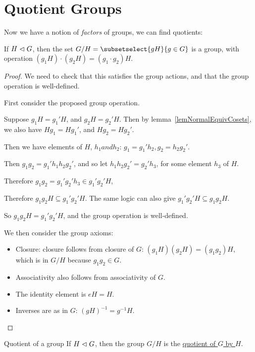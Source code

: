 \documentclass[../Main.tex]{subfiles}
\begin{document}
\section{Quotient Groups}
Now we have a notion of \textit{factors} of groups, we can find quotients:
\begin{theorem}
    If $H \vartriangleleft G$, then the set $G / H = \subsetselect{gH}{g \in G}$ is a group, with operation $(g_1 H) \cdot (g_2 H) = (g_1 \cdot g_2) H$.
    \label{thmQuotientGroups}
\end{theorem}
\begin{proof}
    We need to check that this satisfies the group actions, and that the group operation is well-defined.\par
    First consider the proposed group operation.\par
    Suppose $g_1 H = g_1' H$, and $g_2 H = g_2' H$. Then by lemma~\ref{lemNormalEquivCosets}, we also have $H g_1 = H g_1'$, and $H g_2 = H g_2'$.\par
    Then we have elements of $H$, $h_1 and h_2$: $g_1 = g_1' h_2, g_2 = h_2 g_2'$.\par
    Then $g_1 g_2 = g_1' h_1 h_2 g_2'$, and so let $h_1 h_2 g_2' = g_2' h_3$, for some element $h_3$ of $H$.\par
    Therefore $g_1 g_2 = g_1' g_2' h_3 \in g_1' g_2' H$,\par
    Therefore $g_1 g_2 H \subseteq g_1' g_2' H$. The same logic can also give $g_1' g_2' H \subseteq g_1 g_2 H$.\par
    So $g_1 g_2 H = g_1' g_2' H$, and the group operation is well-defined.\par
    We then consider the group axioms:
    \begin{itemize}
        \item Closure: closure follows from closure of $G$: $(g_1 H)(g_2 H) = (g_1 g_2)H$, which is in $G / H$ because $g_1 g_2 \in G$.
        \item Associativity also follows from associativity of $G$.
        \item The identity element is $eH = H$.
        \item Inverses are as in $G$: $(gH)^{-1} = g^{-1} H$.
    \end{itemize}
\end{proof}
\begin{definition}{Quotient of a group}
    If $H \vartriangleleft G$, then the group $G / H$ is the \underline{quotient of $G$ by $H$}.
\end{definition}
\end{document}

